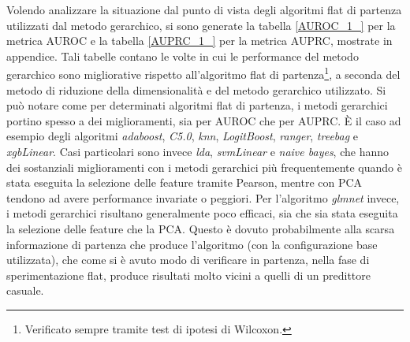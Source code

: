 \documentclass[12pt]{report}
\begin{document}
\begin{table}[h!]
{\begin{subtable}[t]{0.4\textwidth}
                    \label{table1}
                    \end{subtable}}\par\bigskip
\caption{\footnotesize{Confronto tra i diversi metodi di correzione gerarchica e i metodi flat, per la metrica PRC, date le diverse ontologie (BP, MF, CC) e i due metodi di riduzione della dimensionalità usati (FS, PCA). Le tabelle contano le volte in cui, fissato un algoritmo di ML, un metodo ensemble (riga) supera un altro metodo (colonna) a livello di performance (win), risulta equivalente (tie) o performa peggio (loss). Un metodo viene considerato migliorativo rispetto al metodo flat, se il test di Wilcoxon rifiuta l'ipotesi nulla (p-value $<$ 0.01 con correzione di Bonferroni) e se la media della performance per classe è maggiore. Da tali tabelle si desume che in generale in metodi ensemble gerarchici migliorano significativamente le performance rispetto ai metodi flat. Tale differenza è più marcata quando si usa la selezione delle feature con correlazione di Pearson. I metodi TPR e ISO-TPR ottengono i risultati migliori.}}
\label{test_ipotesi2}
\end{table}
\newpage
Volendo analizzare la situazione dal punto di vista degli algoritmi flat di partenza utilizzati dal metodo gerarchico, si sono generate la tabella \ref{AUROC_1_} per la metrica AUROC e la tabella \ref{AUPRC_1_} per la metrica AUPRC, mostrate in appendice. Tali tabelle contano le volte in cui le performance del metodo gerarchico sono migliorative rispetto all'algoritmo flat di partenza\footnote{\footnotesize{Verificato sempre tramite test di ipotesi di Wilcoxon.}}, a seconda del metodo di riduzione della dimensionalità e del metodo gerarchico utilizzato. Si può notare come per determinati algoritmi flat di partenza, i metodi gerarchici portino spesso a dei miglioramenti, sia per AUROC che per AUPRC. È il caso ad esempio degli algoritmi \emph{adaboost}, \emph{C5.0}, \emph{knn}, \emph{LogitBoost}, \emph{ranger}, \emph{treebag} e \emph{xgbLinear}. Casi particolari sono invece \emph{lda}, \emph{svmLinear} e \emph{naive bayes}, che hanno dei sostanziali miglioramenti con i metodi gerarchici più frequentemente quando è stata eseguita la selezione delle feature tramite Pearson, mentre con PCA tendono ad avere performance invariate o peggiori. Per l'algoritmo \emph{glmnet} invece, i metodi gerarchici risultano generalmente poco efficaci, sia che sia stata eseguita la selezione delle feature che la PCA. Questo è dovuto probabilmente alla scarsa informazione di partenza che produce l'algoritmo (con la configurazione base utilizzata), che come si è avuto modo di verificare in partenza, nella fase di sperimentazione flat, produce risultati molto vicini a quelli di un predittore casuale.
\end{document}
